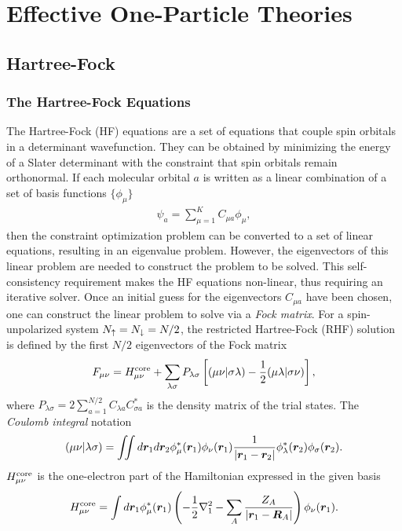 \section{Effective One-Particle Theories}
\subsection{Hartree-Fock}

\subsubsection{The Hartree-Fock Equations}
The Hartree-Fock (HF) equations are a set of equations that couple spin orbitals in a determinant wavefunction. They can be obtained by minimizing the energy of a Slater determinant with the constraint that spin orbitals remain orthonormal. If each molecular orbital $a$ is written as a linear combination of a set of basis functions $\{\phi_\mu\}$
\begin{align} \label{eq:hf-psia}
\psi_a = \sum\limits_{\mu=1}^K C_{\mu a} \phi_\mu,
\end{align}
then the constraint optimization problem can be converted to a set of linear equations, resulting in an eigenvalue problem.
However, the eigenvectors of this linear problem are needed to construct the problem to be solved.
This self-consistency requirement makes the HF equations non-linear, thus requiring an iterative solver.
Once an initial guess for the eigenvectors $C_{\mu a}$ have been chosen, one can construct the linear problem to solve via a \emph{Fock matrix}.
For a spin-unpolarized system $N_{\uparrow}=N_{\downarrow}=N/2$, the restricted Hartree-Fock (RHF) solution is defined by the first $N/2$ eigenvectors of the Fock matrix
\begin{align}
F_{\mu\nu} = H^{\text{core}}_{\mu\nu} + \sum\limits_{\lambda\sigma} P_{\lambda\sigma} \left[
(\mu\nu|\sigma\lambda) - \frac{1}{2}(\mu\lambda|\sigma\nu)
\right],
\end{align} %
where $P_{\lambda\sigma}=2\sum_{a=1}^{N/2} C_{\lambda a}C_{\sigma a}^*$ is the density matrix of the trial states. The \textit{Coulomb integral} notation
\begin{align}
(\mu\nu|\lambda\sigma) = \iint d\boldsymbol{r}_1 d\boldsymbol{r}_2 \phi_\mu^*(\boldsymbol{r}_1)\phi_{\nu}(\boldsymbol{r}_1)
\frac{1}{\vert\boldsymbol{r}_1-\boldsymbol{r}_2\vert}
\phi_\lambda^*(\boldsymbol{r}_2)\phi_\sigma(\boldsymbol{r}_2).
\end{align}
$H^{\text{core}}_{\mu\nu}$ is the one-electron part of the Hamiltonian expressed in the given basis %
\begin{align}
H^{\text{core}}_{\mu\nu} = \int d\boldsymbol{r}_1 \phi_\mu^*(\boldsymbol{r}_1)\left(
-\frac{1}{2}\nabla_1^2-\sum\limits_A \dfrac{Z_A}{\vert\boldsymbol{r}_1-\boldsymbol{R}_A\vert}
\right)  \phi_\nu(\boldsymbol{r}_1).
\end{align}
